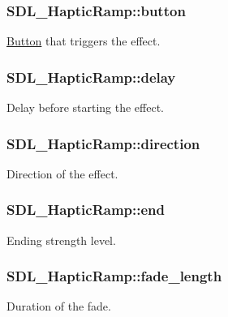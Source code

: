 \subsubsection[{button}]{ S\+D\+L\+\_\+\+Haptic\+Ramp\+::button}\label{struct_s_d_l___haptic_ramp_a2027c6fd88f1ebe652c90c71410ee0bf}
\hyperlink{class_button}{Button} that triggers the effect. \hypertarget{struct_s_d_l___haptic_ramp_ac9471016f41919b4a1c786bbd649a777}{}
\subsubsection[{delay}]{ S\+D\+L\+\_\+\+Haptic\+Ramp\+::delay}\label{struct_s_d_l___haptic_ramp_ac9471016f41919b4a1c786bbd649a777}
Delay before starting the effect. \hypertarget{struct_s_d_l___haptic_ramp_a6fb6c67ccf262b8f3ec08bcdf08f9965}{}
\subsubsection[{direction}]{ S\+D\+L\+\_\+\+Haptic\+Ramp\+::direction}\label{struct_s_d_l___haptic_ramp_a6fb6c67ccf262b8f3ec08bcdf08f9965}
Direction of the effect. \hypertarget{struct_s_d_l___haptic_ramp_a16dd3ee307795248e21ee45ba8fb4c6c}{}
\subsubsection[{end}]{ S\+D\+L\+\_\+\+Haptic\+Ramp\+::end}\label{struct_s_d_l___haptic_ramp_a16dd3ee307795248e21ee45ba8fb4c6c}
Ending strength level. \hypertarget{struct_s_d_l___haptic_ramp_ad58a8f7cfdf659b45f0503fc56db7436}{}
\subsubsection[{fade\+\_\+length}]{ S\+D\+L\+\_\+\+Haptic\+Ramp\+::fade\+\_\+length}\label{struct_s_d_l___haptic_ramp_ad58a8f7cfdf659b45f0503fc56db7436}
Duration of the fade. \hypertarget{struct_s_d_l___haptic_ramp_a66b586f2e6a23a085a7b2854f61752c5}{}
